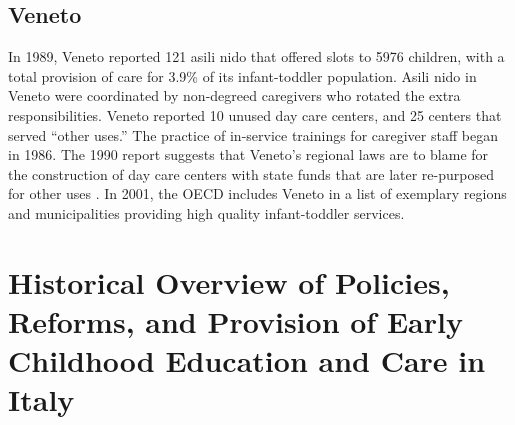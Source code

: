 \documentclass{article}
\theoremstyle{definition}
\theoremstyle{remark}
\begin{document}
\subsection{Veneto}

In 1989, Veneto reported 121 asili nido that offered slots to 5976 children, with a total provision of care for 3.9\% of its infant-toddler population. Asili nido in Veneto were coordinated by non-degreed caregivers who rotated the extra responsibilities. Veneto reported 10 unused day care centers, and 25 centers that served ``other uses.'' The practice of in-service trainings for caregiver staff began in 1986. The 1990 report suggests that Veneto's regional laws are to blame for the construction of day care centers with state funds that are later re-purposed for other uses \citep{Becchi-Ferrari_1990_Pub-Inf-Centres-Italy}. In 2001, the OECD includes Veneto in a list of exemplary regions and municipalities providing high quality infant-toddler services. 
~\\

\section{Historical Overview of Policies, Reforms, and Provision of Early Childhood Education and Care in Italy}
\end{document}
